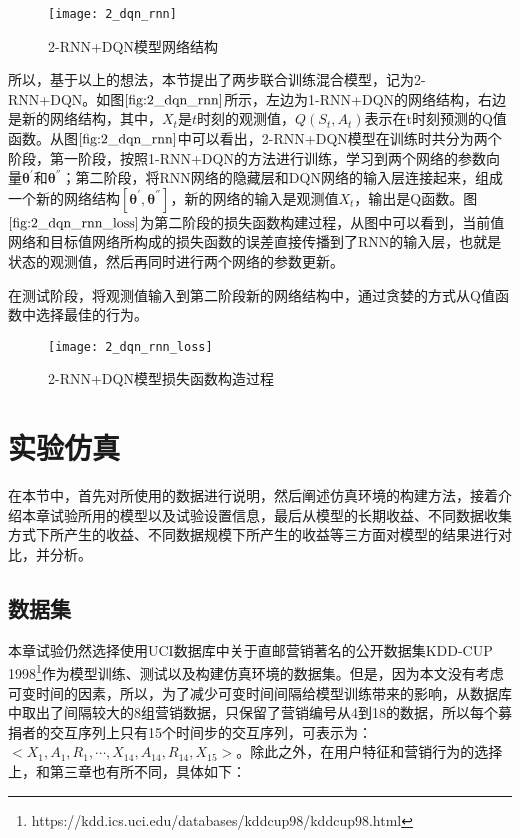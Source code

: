 \begin{figure}[htbp]
\centering
\texttt{[image: 2\_dqn\_rnn]}
\caption{2-RNN+DQN模型网络结构}
\label{fig:2_dqn_rnn}
\end{figure}

所以，基于以上的想法，本节提出了两步联合训练混合模型，记为2-RNN+DQN。如图$\ref{fig:2_dqn_rnn}$所示，左边为1-RNN+DQN的网络结构，右边是新的网络结构，其中，$X_{t}$是$t$时刻的观测值，$Q(S_{t},A_{t})$表示在t时刻预测的Q值函数。从图$\ref{fig:2_dqn_rnn}$中可以看出，2-RNN+DQN模型在训练时共分为两个阶段，第一阶段，按照1-RNN+DQN的方法进行训练，学习到两个网络的参数向量$\bm{\theta}^{'}$和$\bm{\theta}^{''}$；第二阶段，将RNN网络的隐藏层和DQN网络的输入层连接起来，组成一个新的网络结构$[\bm{\theta}^{'},\bm{\theta}^{''}]$，新的网络的输入是观测值$X_{t}$，输出是Q函数。图$\ref{fig:2_dqn_rnn_loss}$为第二阶段的损失函数构建过程，从图中可以看到，当前值网络和目标值网络所构成的损失函数的误差直接传播到了RNN的输入层，也就是状态的观测值，然后再同时进行两个网络的参数更新。

在测试阶段，将观测值输入到第二阶段新的网络结构中，通过贪婪的方式从Q值函数中选择最佳的行为。


\begin{figure}[htbp]
\centering
\texttt{[image: 2\_dqn\_rnn\_loss]}
\caption{2-RNN+DQN模型损失函数构造过程}
\label{fig:2_dqn_rnn_loss}
\end{figure}

\section{实验仿真}
在本节中，首先对所使用的数据进行说明，然后阐述仿真环境的构建方法，接着介绍本章试验所用的模型以及试验设置信息，最后从模型的长期收益、不同数据收集方式下所产生的收益、不同数据规模下所产生的收益等三方面对模型的结果进行对比，并分析。

\subsection{数据集}
本章试验仍然选择使用UCI数据库中关于直邮营销著名的公开数据集KDD-CUP 1998\footnote{https://kdd.ics.uci.edu/databases/kddcup98/kddcup98.html}作为模型训练、测试以及构建仿真环境的数据集。但是，因为本文没有考虑可变时间的因素，所以，为了减少可变时间间隔给模型训练带来的影响，从数据库中取出了间隔较大的8组营销数据，只保留了营销编号从4到18的数据，所以每个募捐者的交互序列上只有15个时间步的交互序列，可表示为：$<X_{1},A_{1},R_{1},\cdots,X_{14},A_{14},R_{14},X_{15}>$。除此之外，在用户特征和营销行为的选择上，和第三章也有所不同，具体如下：

